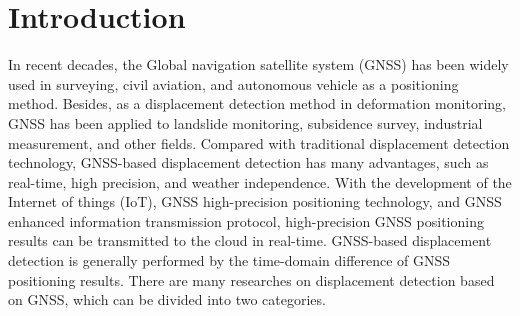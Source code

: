 \documentclass[final,3p,times]{elsarticle}
\begin{document}
	
	\section{Introduction}
	
	\label{intro}
	In recent decades, the Global navigation satellite system (GNSS) has been widely used in surveying\cite{barry2011surveying}, civil aviation\cite{iatsouk2004development}, and autonomous vehicle\cite{kuutti2018survey} as a positioning method. 
	Besides, as a displacement detection method in deformation monitoring, GNSS has been applied to landslide monitoring\cite{awange2012environmental}, subsidence survey\cite{bian2014monitoring}, industrial measurement\cite{pavasovic2011application}, and other fields. 
	Compared with traditional displacement detection technology, GNSS-based displacement detection has many advantages, such as real-time, high precision, and weather independence\cite{shen2019a}. 
	With the development of the Internet of things (IoT), GNSS high-precision positioning technology, and GNSS enhanced information transmission protocol, high-precision GNSS positioning results can be transmitted to the cloud in real-time\cite{mei2019survey}.
	GNSS-based displacement detection is generally performed by the time-domain difference of GNSS positioning results\cite{abidin2004use,rs12203375}. 
	There are many researches on displacement detection based on GNSS, which can be divided into two categories.
	
\end{document}
